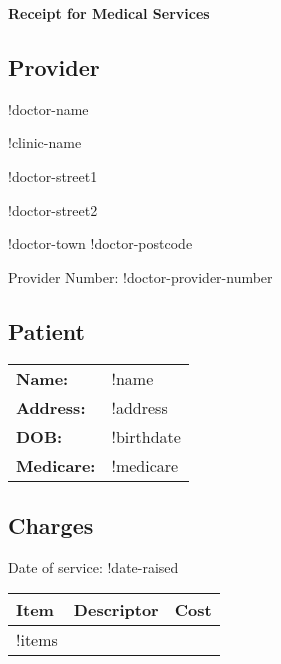 \documentclass[12pt]{article}
\begin{document}
\begin{center}
{ \Large \textbf{Receipt for Medical Services} }
\end{center}

\subsection*{Provider}

!doctor-name 

!clinic-name

!doctor-street1

!doctor-street2

!doctor-town !doctor-postcode

Provider Number: !doctor-provider-number

\subsection*{Patient}

\begin{tabular}{ll}
\textbf{Name:} & !name \\
\textbf{Address:} & !address \\
\textbf{DOB:} & !birthdate \\
\textbf{Medicare:} & !medicare \\
\end{tabular}

\subsection*{Charges}

Date of service: !date-raised 

\vspace{0.5cm}


\begin{tabular}{|l|p{12cm}|r|}
\hline
Item & Descriptor & Cost \\ \hline
!items
\hline
\end{tabular}
\end{document}
